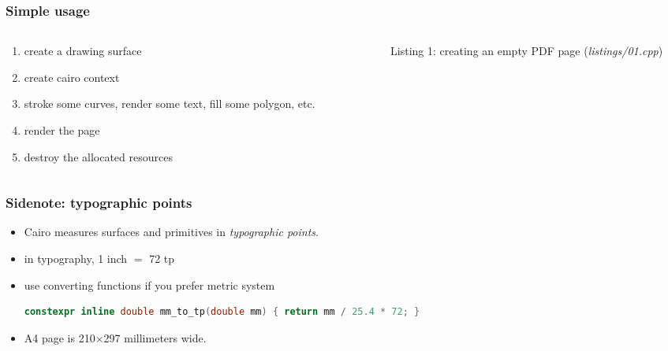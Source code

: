 \documentclass[aspectratio=169]{beamer}
\newcommand{\greenemph}[1]{\textit{\textcolor{clGreen}{#1}}}
\begin{document}
\begin{frame}[fragile]
\frametitle{Simple usage}
\begin{columns}
  \begin{column}{0.3\textwidth}
    \begin{enumerate}
      \item create a drawing surface
      \item create cairo context
      \item stroke some curves, render some text, fill some polygon, etc.
      \item render the page
      \item destroy the allocated resources
    \end{enumerate}
  \end{column}
  \begin{column}{0.05\textwidth}
  \end{column}
  \begin{column}{0.65\textwidth}
    {\tiny
    
    \vspace{-12pt}
    \null\hfill{}Listing 1: creating an empty PDF page (\textit{listings/01.cpp})
    }
  \end{column}
\end{columns}
\end{frame}

\begin{frame}[fragile]
\frametitle{Sidenote: typographic points}
\begin{itemize}
  \item Cairo measures surfaces and primitives in \greenemph{typographic points}.
  \item in typography, 1 inch $=$ 72 tp
  \item use converting functions if you prefer metric system \\
{\tiny
\begin{lstlisting}[language=C++]
constexpr inline double mm_to_tp(double mm) { return mm / 25.4 * 72; }
\end{lstlisting}
}
  \item A4 page is 210$\times$297 millimeters wide.
\end{itemize}
\end{frame}
\end{document}
